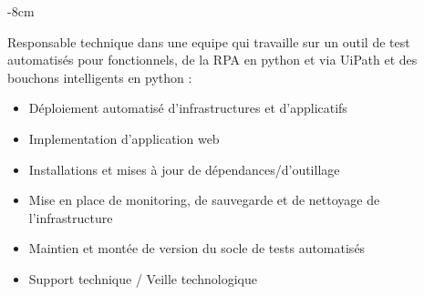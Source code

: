 \documentclass[10pt,a4paper]{altacv}
\begin{document}

\begin{adjustwidth}{}{-8cm}
\makecvheader
\end{adjustwidth}


\divider



Responsable technique dans une equipe qui travaille sur un outil de test automatisés pour fonctionnels, de la RPA en python et via UiPath et des bouchons intelligents en python :
\medskip
\begin{itemize}
    \item Déploiement automatisé d'infrastructures et d'applicatifs
    \item Implementation d'application web
    \item Installations et mises à jour de dépendances/d'outillage 
    \item Mise en place de monitoring, de sauvegarde et de nettoyage de l'infrastructure  
    \item Maintien et montée de version du socle de tests automatisés 
    \item Support technique / Veille technologique
\end{itemize}
\end{document}
